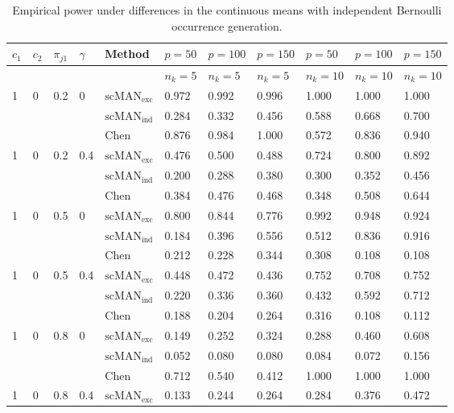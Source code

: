 \begin{table}[H]
\scriptsize
\centering
\caption{Empirical power under differences in the continuous means with independent Bernoulli occurrence generation.}
\label{tab:mean-power-independent}
\begin{tabular}{lllllllllll}
\hline
$c_1$ & $c_2$ & $\pi_{j1}$ & $\gamma$ & Method & $p=50$ & $p=100$ & $p=150$ & $p=50$ & $p=100$ & $p=150$ \\
\hline
& & & & & $n_k=5$ & $n_k=5$ & $n_k=5$ & $n_k=10$ & $n_k=10$ & $n_k=10$ \\
1 & 0 & 0.2 & 0 & $\mathrm{scMAN}_{\mathrm{exc}}$ & 0.972 & 0.992 & 0.996 & 1.000 & 1.000 & 1.000 \\
 &  &  &  & $\mathrm{scMAN}_{\mathrm{ind}}$ & 0.284 & 0.332 & 0.456 & 0.588 & 0.668 & 0.700 \\
 &  &  &  & Chen & 0.876 & 0.984 & 1.000 & 0.572 & 0.836 & 0.940 \\
1 & 0 & 0.2 & 0.4 & $\mathrm{scMAN}_{\mathrm{exc}}$ & 0.476 & 0.500 & 0.488 & 0.724 & 0.800 & 0.892 \\
 &  &  &  & $\mathrm{scMAN}_{\mathrm{ind}}$ & 0.200 & 0.288 & 0.380 & 0.300 & 0.352 & 0.456 \\
 &  &  &  & Chen & 0.384 & 0.476 & 0.468 & 0.348 & 0.508 & 0.644 \\
1 & 0 & 0.5 & 0 & $\mathrm{scMAN}_{\mathrm{exc}}$ & 0.800 & 0.844 & 0.776 & 0.992 & 0.948 & 0.924 \\
 &  &  &  & $\mathrm{scMAN}_{\mathrm{ind}}$ & 0.184 & 0.396 & 0.556 & 0.512 & 0.836 & 0.916 \\
 &  &  &  & Chen & 0.212 & 0.228 & 0.344 & 0.308 & 0.108 & 0.108 \\
1 & 0 & 0.5 & 0.4 & $\mathrm{scMAN}_{\mathrm{exc}}$ & 0.448 & 0.472 & 0.436 & 0.752 & 0.708 & 0.752 \\
 &  &  &  & $\mathrm{scMAN}_{\mathrm{ind}}$ & 0.220 & 0.336 & 0.360 & 0.432 & 0.592 & 0.712 \\
 &  &  &  & Chen & 0.188 & 0.204 & 0.264 & 0.316 & 0.108 & 0.112 \\
1 & 0 & 0.8 & 0 & $\mathrm{scMAN}_{\mathrm{exc}}$ & 0.149 & 0.252 & 0.324 & 0.288 & 0.460 & 0.608 \\
 &  &  &  & $\mathrm{scMAN}_{\mathrm{ind}}$ & 0.052 & 0.080 & 0.080 & 0.084 & 0.072 & 0.156 \\
 &  &  &  & Chen & 0.712 & 0.540 & 0.412 & 1.000 & 1.000 & 1.000 \\
1 & 0 & 0.8 & 0.4 & $\mathrm{scMAN}_{\mathrm{exc}}$ & 0.133 & 0.244 & 0.264 & 0.284 & 0.376 & 0.472 \\

\end{tabular}
\end{table}
